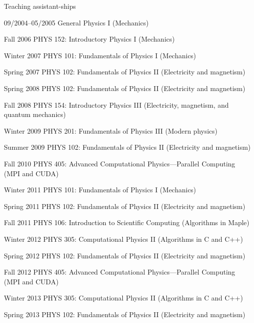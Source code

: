\begin{vita}
\begin{cv}{}
  \begin{cvlist}{Teaching assistant-ships}
  \item[09/2004--05/2005] General Physics I
    (Mechanics)
  \item[Fall 2006] PHYS 152: Introductory Physics I
    (Mechanics)
  \item[Winter 2007] PHYS 101: Fundamentals of Physics I
    (Mechanics)
  \item[Spring 2007] PHYS 102: Fundamentals of Physics II
    (Electricity and magnetism)
  \item[Spring 2008] PHYS 102: Fundamentals of Physics II
    (Electricity and magnetism)
  \item[Fall 2008] PHYS 154: Introductory Physics III
    (Electricity, magnetism, and quantum mechanics)
  \item[Winter 2009] PHYS 201: Fundamentals of Physics III
    (Modern physics)
  \item[Summer 2009] PHYS 102: Fundamentals of Physics II
    (Electricity and magnetism)
  \item[Fall 2010] PHYS 405: Advanced Computational
    Physics---Parallel Computing
    (MPI and CUDA)
  \item[Winter 2011] PHYS 101: Fundamentals of Physics I
    (Mechanics)
  \item[Spring 2011] PHYS 102: Fundamentals of Physics II
    (Electricity and magnetism)
  \item[Fall 2011] PHYS 106: Introduction to Scientific Computing
    (Algorithms in Maple)
  \item[Winter 2012] PHYS 305: Computational Physics II
    (Algorithms in C and C++)
  \item[Spring 2012] PHYS 102: Fundamentals of Physics II
    (Electricity and magnetism)
  \item[Fall 2012] PHYS 405: Advanced Computational
    Physics---Parallel Computing
    (MPI and CUDA)
  \item[Winter 2013] PHYS 305: Computational Physics II
    (Algorithms in C and C++)
  \item[Spring 2013] PHYS 102: Fundamentals of Physics II
    (Electricity and magnetism)
  \end{cvlist}


\end{cv}
\end{vita}
